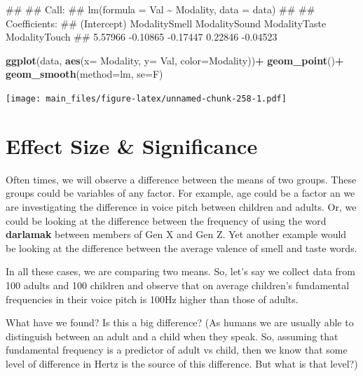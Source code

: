 \documentclass[
]{book}
\newenvironment{Shaded}{\begin{snugshade}}{\end{snugshade}}
\newcommand{\AttributeTok}[1]{\textcolor[rgb]{0.13,0.29,0.53}{#1}}
\newcommand{\FunctionTok}[1]{\textcolor[rgb]{0.13,0.29,0.53}{\textbf{#1}}}
\newcommand{\NormalTok}[1]{#1}
\newcommand{\SpecialCharTok}[1]{\textcolor[rgb]{0.81,0.36,0.00}{\textbf{#1}}}
\newcommand{\StringTok}[1]{\textcolor[rgb]{0.31,0.60,0.02}{#1}}
\begin{document}
\begin{Shaded}
\begin{Highlighting}[]
\NormalTok{\#\# }
\NormalTok{\#\# Call:}
\NormalTok{\#\# lm(formula = Val \textasciitilde{} Modality, data = data)}
\NormalTok{\#\# }
\NormalTok{\#\# Coefficients:}
\NormalTok{\#\#   (Intercept)  ModalitySmell  ModalitySound  ModalityTaste  ModalityTouch  }
\NormalTok{\#\#       5.57966       {-}0.10865       {-}0.17447        0.22846       {-}0.04523}
\end{Highlighting}
\end{Shaded}

\begin{Shaded}
\begin{Highlighting}[]
\FunctionTok{ggplot}\NormalTok{(data, }\FunctionTok{aes}\NormalTok{(}\AttributeTok{x=}\NormalTok{ Modality, }\AttributeTok{y=}\NormalTok{ Val, }\AttributeTok{color=}\NormalTok{Modality))}\SpecialCharTok{+}
  \FunctionTok{geom\_point}\NormalTok{()}\SpecialCharTok{+}
  \FunctionTok{geom\_smooth}\NormalTok{(}\AttributeTok{method=}\StringTok{\textquotesingle{}lm\textquotesingle{}}\NormalTok{, }\AttributeTok{se=}\NormalTok{F)}
\end{Highlighting}
\end{Shaded}

\texttt{[image: main\_files/figure-latex/unnamed-chunk-258-1.pdf]}

\chapter{Effect Size \& Significance}\label{effect-size-significance}

Often times, we will observe a difference between the means of two groups. These groups could be variables of any factor. For example, age could be a factor an we are investigating the difference in voice pitch between children and adults. Or, we could be looking at the difference between the frequency of using the word \textbf{darlamak} between members of Gen X and Gen Z. Yet another example would be looking at the difference between the average valence of smell and taste words.

In all these cases, we are comparing two means. So, let's say we collect data from 100 adults and 100 children and observe that on average children's fundamental frequencies in their voice pitch is 100Hz higher than those of adults.

What have we found? Is this a big difference? (As humans we are usually able to distinguish between an adult and a child when they speak. So, assuming that fundamental frequency is a predictor of adult vs child, then we know that some level of difference in Hertz is the source of this difference. But what is that level?)
\end{document}
